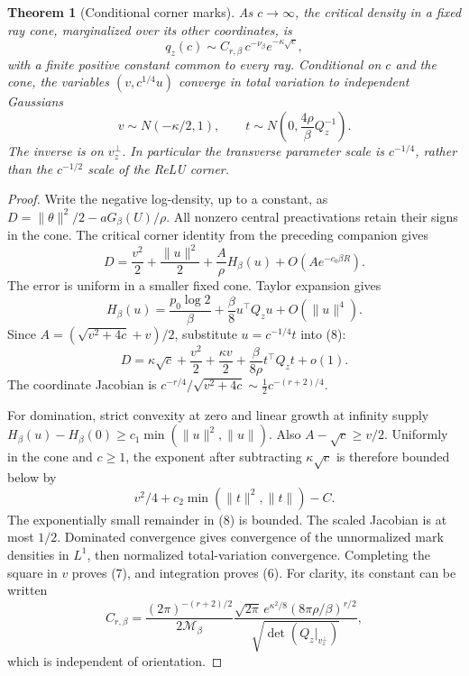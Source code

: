 \documentclass[11pt]{article}
\newtheorem{theorem}{Theorem}\newtheorem{lemma}[theorem]{Lemma}
\begin{document}
\begin{theorem}[Conditional corner marks]\label{thm:corner}
As $c\to\infty$, the critical density in a fixed ray cone, marginalized
over its other coordinates, is
\[
             q_z(c)\sim C_{r,\beta}\,
                     c^{-\nu_\beta}e^{-\kappa\sqrt c},  \tag{6}
\]
with a finite positive constant common to every ray. Conditional on $c$
and the cone, the variables $(v,c^{1/4}u)$ converge in total variation
to independent Gaussians
\[
 v\sim N(-\kappa/2,1),\qquad
 t\sim N\left(0,\frac{4\rho}{\beta}Q_z^{-1}\right).     \tag{7}
\]
The inverse is on $v_z^\perp$. In particular the transverse parameter
scale is $c^{-1/4}$, rather than the $c^{-1/2}$ scale of the ReLU corner.
\end{theorem}
\begin{proof}
Write the negative log-density, up to a constant, as
$D=\|\theta\|^2/2-aG_\beta(U)/\rho$.
All nonzero central preactivations retain their signs in the cone. The
critical corner identity from the preceding companion gives
\[
 D=\frac{v^2}{2}+\frac{\|u\|^2}{2}
                 +\frac A\rho H_\beta(u)+O(Ae^{-c_0\beta R}). \tag{8}
\]
The error is uniform in a smaller fixed cone. Taylor expansion gives
\[
 H_\beta(u)=\frac{p_0\log2}{\beta}
                  +\frac\beta8 u^\top Q_z u+O(\|u\|^4).
\]
Since $A=(\sqrt{v^2+4c}+v)/2$, substitute $u=c^{-1/4}t$ into (8):
\[
 D=\kappa\sqrt c+\frac{v^2}{2}+\frac{\kappa v}{2}
                    +\frac\beta{8\rho}t^\top Q_z t+o(1). \tag{9}
\]
The coordinate Jacobian is
$c^{-r/4}/\sqrt{v^2+4c}\sim\tfrac12c^{-(r+2)/4}$.

For domination, strict convexity at zero and linear growth at infinity
supply
$H_\beta(u)-H_\beta(0)\ge c_1\min(\|u\|^2,\|u\|)$.
Also $A-\sqrt c\ge v/2$. Uniformly in the cone and $c\ge1$, the
exponent after subtracting $\kappa\sqrt c$ is therefore bounded below by
\[
             v^2/4+c_2\min(\|t\|^2,\|t\|)-C.
\]
The exponentially small remainder in (8) is bounded. The scaled Jacobian
is at most $1/2$. Dominated convergence gives convergence of the
unnormalized mark densities in $L^1$, then normalized total-variation
convergence. Completing the square in $v$ proves (7), and integration
proves (6). For clarity, its constant can be written
\[
 C_{r,\beta}=
 \frac{(2\pi)^{-(r+2)/2}}{2\mathcal M_\beta}
 \frac{\sqrt{2\pi}\,e^{\kappa^2/8}(8\pi\rho/\beta)^{r/2}}
      {\sqrt{\det(Q_z|_{v_z^\perp})}},                   \tag{10}
\]
which is independent of orientation.
\end{proof}
\end{document}
